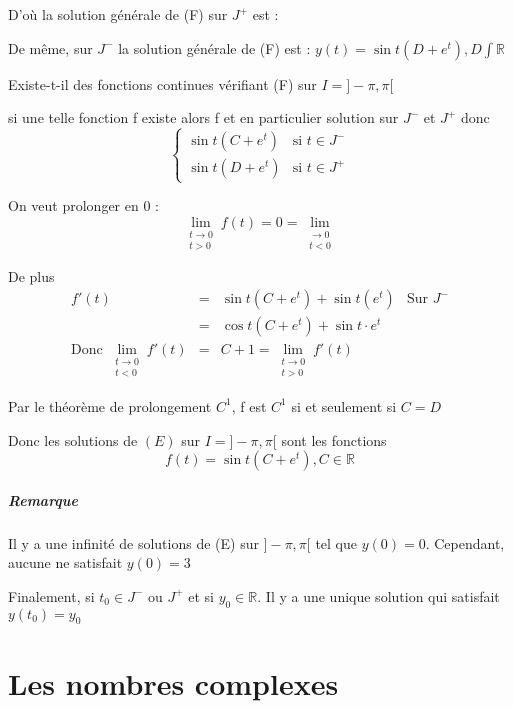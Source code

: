 D'où la solution générale de (F) sur $J^+$ est :

\begin{center}
\end{center}

De même, sur $J^-$ la solution générale de (F) est : $y(t) = \sin t(D+e^t), D\int \mathbb{R}$

Existe-t-il des fonctions continues vérifiant (F) sur $I = ]-\pi, \pi[$

si une telle fonction f existe alors f et en particulier solution sur $J^-$ et $J^+$ donc \[\left\{\begin{array}{rcl}
	\sin t(C + e^t) & \text{si } t \in J^- \\
	\sin t(D + e^t) & \text{si } t \in J^+\end{array}\right.\] 

On veut prolonger en 0 :\[\lim_{\substack{t \to 0 \\ t > 0}} f(t) = 0 = \lim_{\substack{\to 0 \\ t < 0}}\]

De plus
\[\begin{array}{rclr}
	f'(t)  &=& \sin t(C+e^t) + \sin t(e^t) & \text{Sur } J^-\\
		&=& \cos t(C +e^t) + \sin t \cdot e^t \\
\text{Donc } \lim_{\substack{t \to 0 \\ t < 0}} f'(t) &=& C+1 = \lim_{\substack{t \to 0 \\ t > 0}} f'(t) \end{array}\]

Par le théorème de prolongement $C^1$, f est $C^1$ si et seulement si $C=D$

Donc les solutions de $(E)$ sur $I = ]-\pi, \pi[$ sont les fonctions \[f(t) = \sin t(C+e^t), C\in \mathbb{R}\]

\paragraph{Remarque} Il y a une infinité de solutions de (E) sur $]-\pi, \pi[$ tel que $y(0)=0$. Cependant, aucune ne satisfait $y(0)=3$

Finalement, si $t_0 \in J^-$ ou $J^+$ et si $y_0 \in \mathbb{R}$. Il y a une unique solution qui satisfait $y(t_0)=y_0$

\chapter{Les nombres complexes}
